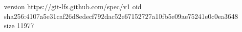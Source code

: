 version https://git-lfs.github.com/spec/v1
oid sha256:4107a5e31caf26d8edecf792dac52e67152727a10fb5e09ae75241e0c0ea3648
size 11977
